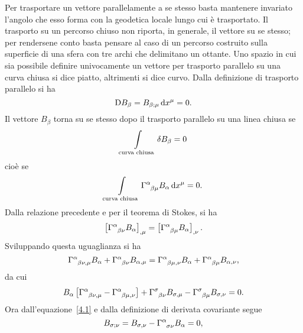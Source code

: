Per trasportare un vettore parallelamente a se stesso basta mantenere invariato
l'angolo che esso forma con la geodetica locale lungo cui è trasportato.  Il
trasporto su un percorso chiuso non riporta, in generale, il vettore su se
stesso; per rendersene conto basta pensare al caso di un percorso costruito
sulla superficie di una sfera con tre archi che delimitano un ottante.  Uno
spazio in cui sia possibile definire univocamente un vettore per trasporto
parallelo su una curva chiusa si dice piatto, altrimenti si dice curvo.  Dalla
definizione di trasporto parallelo si ha
\begin{equation}
  \mathop{}\!\mathrm{D} B_{\beta} = B_{\beta;\mu} \mathop{}\!\mathrm{d} x^{\mu}=0.
  \label{4.1}
\end{equation}
Il vettore $B_{\beta}$ torna su se stesso dopo il trasporto parallelo su una
linea chiusa se
\begin{equation}
  \label{4.24}
  \int\limits_{\textup{curva chiusa}} \delta B_{\beta}=0
\end{equation}
cioè se
\begin{equation}
  \int\limits_{\textup{curva chiusa}} \tensor{\Gamma}{^{\alpha}_{\beta \mu}}
  B_{\alpha} \dd x^{\mu} =0.
\end{equation}
Dalla relazione precedente e per il teorema di Stokes, si ha
\begin{equation}
  \left[\tensor{\Gamma}{^{\alpha}_{\beta \nu}} B_{\alpha} \right]_{,\mu} =
  \left[\tensor{\Gamma}{^{\alpha}_{\beta \mu}} B_{\alpha} \right]_{,\nu}.
\end{equation}
Sviluppando questa uguaglianza si ha
\begin{equation}
  \tensor{\Gamma}{^{\alpha}_{\beta \nu ,\mu}} B_{\alpha} +
  \tensor{\Gamma}{^{\alpha}_{\beta \nu}} B_{\alpha ,\mu} =
  \tensor{\Gamma}{^{\alpha}_{\beta \mu, \nu}} B_{\alpha} +
  \tensor{\Gamma}{^{\alpha}_{\beta \mu}} B_{\alpha , \nu},
\end{equation}
da cui
\begin{equation}
  \label{4.5}
  B_{\alpha} \left[ \tensor{\Gamma}{^{\alpha}_{\beta \nu , \mu}}
    -\tensor{\Gamma}{^{\alpha}_{\beta \mu ,\nu}} \right] +
  \tensor{\Gamma}{^{\sigma}_{\beta \nu}} B_{\sigma,\mu} -
  \tensor{\Gamma}{^{\sigma}_{\beta \mu}} B_{\sigma,\nu} = 0.
\end{equation}
Ora dall'equazione~\eqref{4.1} e dalla definizione di derivata covariante segue
\begin{equation}
  B_{\sigma;\nu} = B_{\sigma,\nu}-\tensor{\Gamma}{^{\alpha}_{\sigma \nu}}
  B_{\alpha} = 0,
\end{equation}
